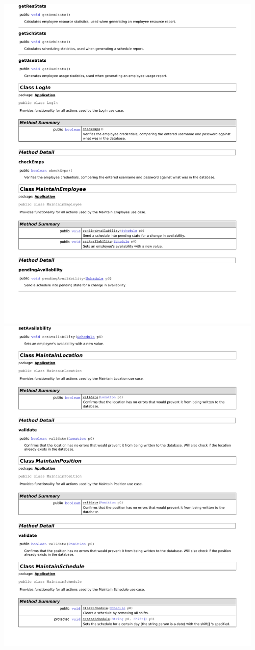 \documentclass[letterpaper,12pt]{report}
\begin{document}
\includegraphics[scale=0.9,trim=20mm 30mm 25mm 8mm]{externals/dd2.pdf}
\newpage
\includegraphics[scale=0.9,trim=20mm 40mm 25mm 8mm]{externals/dd3.pdf}
\end{document}
